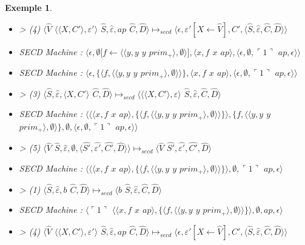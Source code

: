 \documentclass[10pt,a4paper]{report}
\newtheorem{ex}{Exemple}
\begin{document}
\begin{ex}
\begin{itemize}
			\item[] > (4) $\langle\widehat{V}$ $\langle\langle X,C'\rangle,\varepsilon'\rangle$ $\widehat{S},\widehat{\varepsilon},ap$ $\widehat{C},\widehat{D}\rangle \longmapsto_{secd} \langle\epsilon,\varepsilon'[X \leftarrow \widehat{V}],C',\langle\widehat{S},\widehat{\varepsilon},\widehat{C},\widehat{D}\rangle\rangle$
			\item[] SECD Machine : $\langle\epsilon,\emptyset[f \leftarrow \langle\langle y,y$ $y$ $prim_{+}\rangle,\emptyset\rangle],\langle x,f$ $x$ $ap\rangle,\langle\epsilon,\emptyset,\ulcorner 1\urcorner$ $ap,\epsilon\rangle\rangle$
			\item[] SECD Machine : $\langle\epsilon,\{\langle f,\langle\langle y,y$ $y$ $prim_{+}\rangle,\emptyset\rangle\rangle\},\langle x,f$ $x$ $ap\rangle,\langle\epsilon,\emptyset,\ulcorner 1\urcorner$ $ap,\epsilon\rangle\rangle$
			\item[] >  (3) $\langle\widehat{S},\widehat{\varepsilon},\langle X,C'\rangle$ $\widehat{C},\widehat{D}\rangle \longmapsto_{secd} \langle\langle\langle X,C'\rangle,\varepsilon\rangle$ $\widehat{S},\widehat{\varepsilon},\widehat{C},\widehat{D}\rangle$
			\item[] SECD Machine : $\langle\langle\langle x,f$ $x$ $ap\rangle,\{\langle f,\langle\langle y,y$ $y$ $prim_{+}\rangle,\emptyset\rangle\rangle\}\rangle,\{f,\langle\langle y,y$ $y$ $prim_{+}\rangle,\emptyset\rangle\},\emptyset,\langle\epsilon,\emptyset,\ulcorner 1\urcorner$ $ap,\epsilon\rangle\rangle$
			\item[] > (5) $\langle\widehat{V}$ $\widehat{S},\widehat{\varepsilon},\emptyset,\langle\widehat{S'},\widehat{\varepsilon'},\widehat{C'},\widehat{D}\rangle\rangle \longmapsto_{secd} \langle \widehat{V}$ $\widehat{S'},\widehat{\varepsilon'},\widehat{C'},\widehat{D}\rangle$
			\item[] SECD Machine : $\langle\langle\langle x,f$ $x$ $ap\rangle,\{\langle f,\langle\langle y,y$ $y$ $prim_{+}\rangle,\emptyset\rangle\rangle\}\rangle,\emptyset,\ulcorner 1\urcorner$ $ap,\epsilon\rangle$
			\item[] >  (1) $\langle\widehat{S},\widehat{\varepsilon},b$ $\widehat{C},\widehat{D}\rangle \longmapsto_{secd} \langle b$ $\widehat{S},\widehat{\varepsilon},\widehat{C},\widehat{D}\rangle$
			\item[] SECD Machine :  $\langle\ulcorner 1\urcorner$ $\langle\langle x,f$ $x$ $ap\rangle,\{\langle f,\langle\langle y,y$ $y$ $prim_{+}\rangle,\emptyset\rangle\rangle\}\rangle,\emptyset,ap,\epsilon\rangle$
			\item[] >  (4) $\langle\widehat{V}$ $\langle\langle X,C'\rangle,\varepsilon'\rangle$ $\widehat{S},\widehat{\varepsilon},ap$ $\widehat{C},\widehat{D}\rangle \longmapsto_{secd} \langle\epsilon,\varepsilon'[X \leftarrow \widehat{V}],C',\langle\widehat{S},\widehat{\varepsilon},\widehat{C},\widehat{D}\rangle\rangle$

\end{itemize}
\end{ex}
\end{document}
